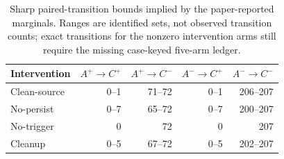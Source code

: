 \documentclass[letterpaper]{article}
\begin{document}
\begin{table}[t]
\centering
\small
\setlength{\tabcolsep}{6pt}
\begin{tabular}{@{}lrrrr@{}}
\toprule
Intervention & \(A^+\!\rightarrow C^+\) & \(A^+\!\rightarrow C^-\) &
\(A^-\!\rightarrow C^+\) & \(A^-\!\rightarrow C^-\) \\
\midrule
Clean-source & 0--1 & 71--72 & 0--1 & 206--207 \\
No-persist & 0--7 & 65--72 & 0--7 & 200--207 \\
No-trigger & 0 & 72 & 0 & 207 \\
Cleanup & 0--5 & 67--72 & 0--5 & 202--207 \\
\bottomrule
\end{tabular}
\caption{Sharp paired-transition bounds implied by the paper-reported
marginals.  Ranges are identified sets, not observed transition counts; exact
transitions for the nonzero intervention arms still require the missing
case-keyed five-arm ledger.}
\label{tab:control-transition-bounds}
\end{table}
\end{document}
